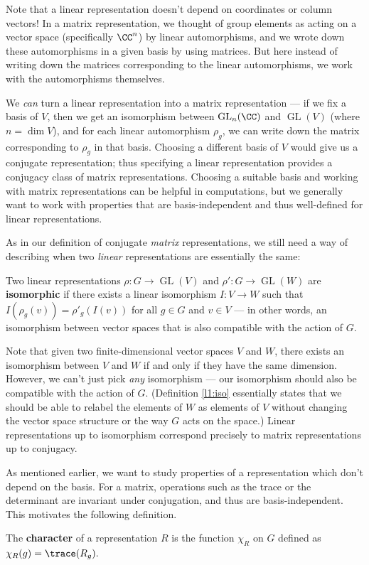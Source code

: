 Note that a linear representation doesn't depend on coordinates or column vectors! In a matrix representation, we thought of group elements as acting on a vector space (specifically $\CC^n$) by linear automorphisms, and we wrote down these automorphisms in a given basis by using matrices. But here instead of writing down the matrices corresponding to the linear automorphisms, we work with the automorphisms themselves.

We \emph{can} turn a linear representation into a matrix representation --- if we fix a basis of $V$, then we get an isomorphism between $\operatorname{GL}_n(\CC)$ and $\operatorname{GL}(V)$ (where $n = \dim V$), and for each linear automorphism $\rho_g$, we can write down the matrix corresponding to $\rho_g$ in that basis. Choosing a different basis of $V$ would give us a conjugate representation; thus specifying a linear representation provides a conjugacy class of matrix representations. Choosing a suitable basis and working with matrix representations can be helpful in computations, but we generally want to work with properties that are basis-independent and thus well-defined for linear representations.

As in our definition of conjugate \emph{matrix} representations, we still need a way of describing when two \emph{linear} representations are essentially the same: 

\begin{definition}\label{l1:iso}
Two linear representations $\rho : G \to \operatorname{GL}(V)$ and $\rho' : G \to \operatorname{GL}(W)$ are \textbf{isomorphic} if there exists a linear isomorphism $I : V \to W$ such that $I(\rho_g(v)) = \rho'_g(I(v))$ for all $g \in G$ and $v \in V$ --- in other words, an isomorphism between vector spaces that is also compatible with the action of $G$.
\end{definition}

Note that given two finite-dimensional vector spaces $V$ and $W$, there exists an isomorphism between $V$ and $W$ if and only if they have the same dimension. However, we can't just pick \emph{any} isomorphism --- our isomorphism should also be compatible with the action of $G$. (Definition \ref{l1:iso} essentially states that we should be able to relabel the elements of $W$ as elements of $V$ without changing the vector space structure or the way $G$ acts on the space.) Linear representations up to isomorphism correspond precisely to matrix representations up to conjugacy. 

As mentioned earlier, we want to study properties of a representation which don't depend on the basis. For a matrix, operations such as the trace or the determinant are invariant under conjugation, and thus are basis-independent. This motivates the following definition.
\begin{definition}[Character]
The \textbf{character} of a representation $R$ is the function $\chi_R$ on $G$ defined as $\chi_R(g) = \trace(R_g).$
\end{definition}

